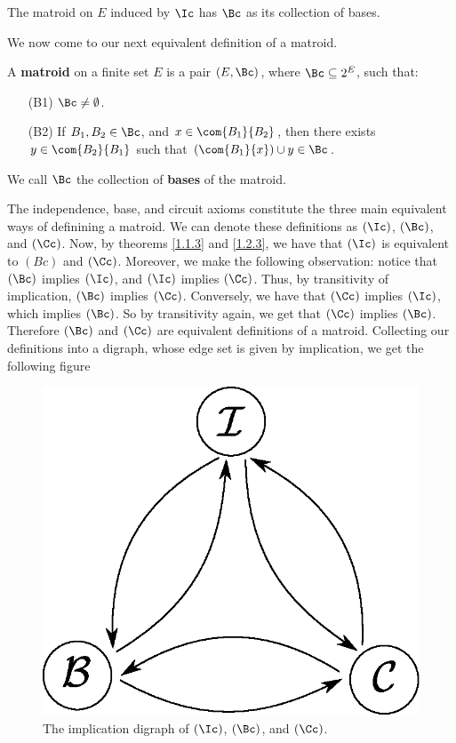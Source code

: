 \begin{corollary}
    The matroid on $E$ induced by  $\Ic$ has  $\Bc$ as its collection of bases.
\end{corollary}

We now come to our next equivalent definition of a matroid.

\begin{definition}
    A \textbf{matroid} on a finite set $E$ is a pair $(E,\Bc)$, where $\Bc
    \subseteq 2^E$, such that:
    \begin{enumerate}
        \item[(B1)] $\Bc \neq \emptyset$.

        \item [(B2)] If $B_1,B_2 \in \Bc$, and $x \in \com{B_1}{B_2}$, then
            there exists $y \in \com{B_2}{B_1}$ such that $(\com{B_1}{x}) \cup y
            \in \Bc$.
    \end{enumerate}
    We call $\Bc$ the collection of \textbf{bases} of the matroid.
\end{definition}

The independence, base, and circuit axioms constitute the three main equivalent
ways of definining a matroid. We can denote these definitions as $(\Ic)$, $(\Bc)$,
and $(\Cc)$. Now, by theorems \ref{1.1.3} and  \ref{1.2.3}, we have that $(\Ic)$
is equivalent to  $(Bc)$ and $(\Cc)$. Moreover, we make the following
observation: notice that $(\Bc)$ implies $(\Ic)$, and $(\Ic)$ implies $(\Cc)$.
Thus, by transitivity of implication, $(\Bc)$ implies $(\Cc)$. Conversely, we
have that $(\Cc)$ implies $(\Ic)$, which implies $(\Bc)$. So by transitivity
again, we get that $(\Cc)$ implies $(\Bc)$. Therefore $(\Bc)$ and $(\Cc)$ are
equivalent definitions of a matroid. Collecting our definitions into a
digraph, whose edge set is given by implication, we get the following figure

\begin{figure}[h]
    \centering
    \includegraphics[scale=0.5]{Figures/Chapter1/equiv_def_1.eps}
    \caption{The implication digraph of $(\Ic)$, $(\Bc)$, and $(\Cc)$.}
    \label{fig_1.3}
\end{figure}
